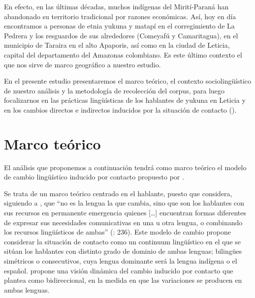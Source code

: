 \documentclass[output=paper]{langscibook}
\begin{document}
En efecto, en las últimas décadas, muchos indígenas del Mirití-Paraná han abandonado su territorio tradicional por razones económicas. Así, hoy en día encontramos a personas de etnia yukuna y matapí en el corregimiento de La Pedrera y los resguardos de sus alrededores (Comeyafú y Camaritagua), en el municipio de Taraira en el alto Apaporis, así como en la ciudad de Leticia, capital del departamento del Amazonas colombiano. Es este último contexto el que nos sirve de marco geográfico a nuestro estudio.  

En el presente estudio presentaremos el marco teórico, el contexto sociolingüístico de nuestro análisis y la metodología de recolección del corpus, para luego focalizarnos en las prácticas lingüísticas de los hablantes de yukuna en Leticia y en los cambios directos e indirectos inducidos por la situación de contacto (\citealt{PalaciosAlcaine2007compatibles}).

\section{Marco teórico}


El análisis que proponemos a continuación tendrá como marco teórico el modelo de cambio lingüístico inducido por contacto propuesto por \citet{PalaciosAlcaine2007compatibles,PalaciosAlcaine2010,PalaciosAlcaine2019}.

Se trata de un marco teórico centrado en el hablante, puesto que considera, siguiendo a \citet{Milroy1992}, que “no es la lengua la que cambia, sino que son los hablantes con sus recursos en permanente emergencia quienes […] encuentran formas diferentes de expresar sus necesidades comunicativas en una u otra lengua, o combinando los recursos lingüísticos de ambas” (\citealt{PalaciosAlcaine2019}: 236). Este modelo de cambio propone considerar la situación de contacto como un continuum lingüístico en el que se sitúan los hablantes con distinto grado de dominio de ambas lenguas; bilingües simétricos o consecutivos, cuya lengua dominante será la lengua indígena o el español.  \citet[262]{PalaciosAlcaine2007compatibles} propone una visión dinámica del cambio inducido por contacto que plantea como bidireccional, en la medida en que las variaciones se producen en ambas lenguas.
\end{document}
